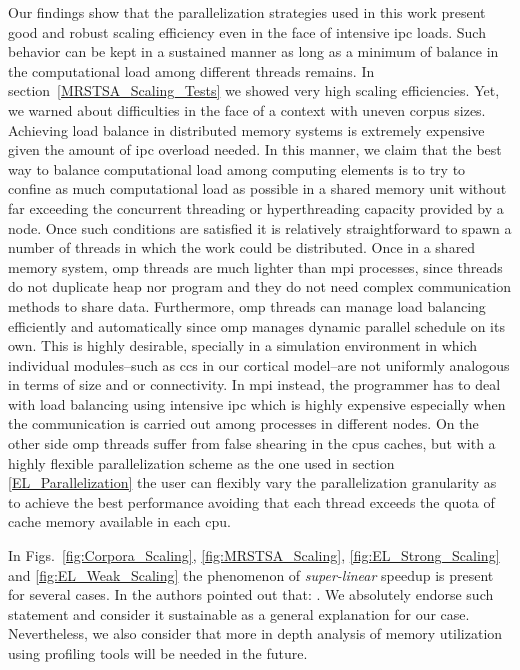\documentclass[10pt,journal,compsoc]{IEEEtran}
\begin{document}
Our findings show that the parallelization strategies used in this work present good and robust scaling efficiency even in the face of intensive \gls{ipc} loads. Such behavior can be kept in a sustained manner as long as a minimum of balance in the computational load among different threads remains. In section~\ref{MRSTSA_Scaling_Tests} we showed very high scaling efficiencies. Yet, we warned about difficulties in the face of a context with uneven corpus sizes. Achieving load balance in distributed memory systems is extremely expensive given the amount of \gls{ipc} overload needed. In this manner, we claim that the best way to balance computational load among computing elements is to try to confine as much computational load as possible in a shared memory unit without far exceeding the concurrent threading or hyperthreading capacity provided by a node. Once such conditions are satisfied it is relatively straightforward to spawn a number of threads in which the work could be distributed. Once in a shared memory system, \gls{omp} threads are much lighter than \gls{mpi} processes, since threads do not duplicate heap nor program and they do not need complex communication methods to share data. Furthermore, \gls{omp} threads can manage load balancing efficiently and automatically since \gls{omp} manages dynamic parallel schedule on its own. This is highly desirable, specially in a simulation environment in which individual modules--such as \glspl{cc} in our cortical model--are not uniformly analogous in terms of size and or connectivity. In \gls{mpi} instead, the programmer has to deal with load balancing using intensive \gls{ipc} which is highly expensive especially when the communication is carried out among processes in different nodes. On the other side \gls{omp} threads suffer from false shearing in the \glspl{cpu} caches, but with a highly flexible parallelization scheme as the one used in section \ref{EL_Parallelization} the user can flexibly vary the parallelization granularity as to achieve the best performance avoiding that each thread exceeds the quota of cache memory available in each \gls{cpu}.

In Figs.~\ref{fig:Corpora_Scaling}, \ref{fig:MRSTSA_Scaling}, \ref{fig:EL_Strong_Scaling} and \ref{fig:EL_Weak_Scaling} the phenomenon of \emph{super-linear} speedup is present for several cases. In \cite{7733347} the authors pointed out that: . We absolutely endorse such statement and consider it sustainable as a general explanation for our case. Nevertheless, we also consider that more in depth analysis of memory utilization using profiling tools will be needed in the future.  
\end{document}
